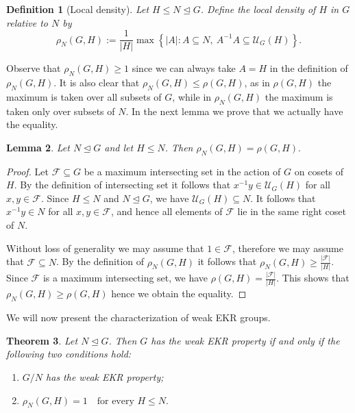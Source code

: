 \documentclass[10pt,a4paper]{amsart}
\newtheorem{theorem}{Theorem}[section]
\newtheorem{lemma}[theorem]{Lemma}
\newtheorem{definition}[theorem]{Definition}
\begin{document}
\begin{definition}[Local density]
\label{def:local-defect}
Let \(H\leq N\trianglelefteq G\). Define the {local density of \(H\) in \(G\) relative to \(N\)} by
\[
\rho_N(G,H)
 :=\frac{1}{|H|}
 \max\left\{
 |A|:
 A\subseteq N,\ 
 A^{-1}A\subseteq \mathcal{U}_G(H)
 \right\}.
\]
 

\end{definition}

Observe that $\rho_N(G,H)\geq 1$ since we can always take \(A=H\) in the definition of
\(\rho_N(G,H)\). It is also clear that $\rho_N(G,H)\leq \rho(G,H)$, as in $\rho(G,H)$ the maximum is taken over all subsets of $G$, while in $\rho_N(G,H)$ the maximum is taken only over subsets of $N$. In the next lemma we prove that we actually have the equality.

\begin{lemma}
\label{lem:local-defect-realization}
Let \(N\trianglelefteq G\) and let \(H\leq N\). Then
\(
\rho_N(G,H)=\rho(G,H).
\)
\end{lemma}

\begin{proof}
Let \(\mathcal{F}\subseteq G\) be a maximum intersecting  set in the action of \(G\)
on cosets of \(H\). By the definition of intersecting set it follows that
\(
x^{-1}y\in \mathcal{U}_G(H)\)
for all \(x,y\in\mathcal{F}.
\)
Since \(H\leq N\) and \(N\trianglelefteq G\), we have
\(
\mathcal{U}_G(H)\subseteq N.
\)
It follows that \(x^{-1}y\in N\) for all \(x,y\in\mathcal{F}\), and
hence all elements of \(\mathcal{F}\) lie in the same right coset of
\(N\).

Without loss of generality we may assume that $1\in \mathcal{F}$, therefore we may assume that
\(\mathcal{F}\subseteq N\). By the definition of $\rho_N(G,H)$ it follows that $\rho_N(G,H)\geq \frac{|\mathcal{F}|}{|H|}$. Since $\mathcal{F}$ is a maximum intersecting set, we have 
$\rho(G,H)=\frac{|\mathcal{F}|}{|H|}$. 
This shows that $\rho_N(G,H)\geq \rho(G,H)$ hence we obtain the equality.
\end{proof}

We will now present the characterization of weak EKR groups.


\begin{theorem}
\label{thm:normal-extension}
Let \(N\trianglelefteq G\). Then \(G\) has the weak EKR property if
and only if the following two conditions hold:
\begin{enumerate}
\item \(G/N\) has the weak EKR property;
\item
\(
\rho_N(G,H)=1
\quad\text{for every }H\leq N.
\)
\end{enumerate}
\end{theorem}
\end{document}
